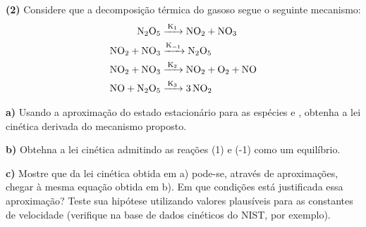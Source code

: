\textbf{(2)} Considere que a decomposição térmica do  gasoso segue o seguinte mecanismo:
\begin{align*}
    \ce{N2O5 &->[{K_1}] NO2 + NO3}\\
    \ce{NO2 + NO3 &->[{K_{-1}}] N2O5}\\
    \ce{NO2 + NO3 &->[{K_2}] NO2 + O2 + NO}\\
    \ce{NO + N2O5 &->[{K_3}] 3NO2}
\end{align*}

\textbf{a)} Usando a aproximação do estado estacionário para as espécies  e , obtenha a lei cinética derivada do mecanismo proposto.

\textbf{b)} Obtehna a lei cinética admitindo as reações (1) e (-1) como um equilíbrio.

\textbf{c)} Mostre que da lei cinética obtida em a) pode-se, através de aproximações, chegar à mesma equação obtida em b). Em que condições está justificada essa aproximação? Teste sua hipótese utilizando valores plausíveis para as constantes de velocidade (verifique na base de dados cinéticos do NIST, por exemplo).
